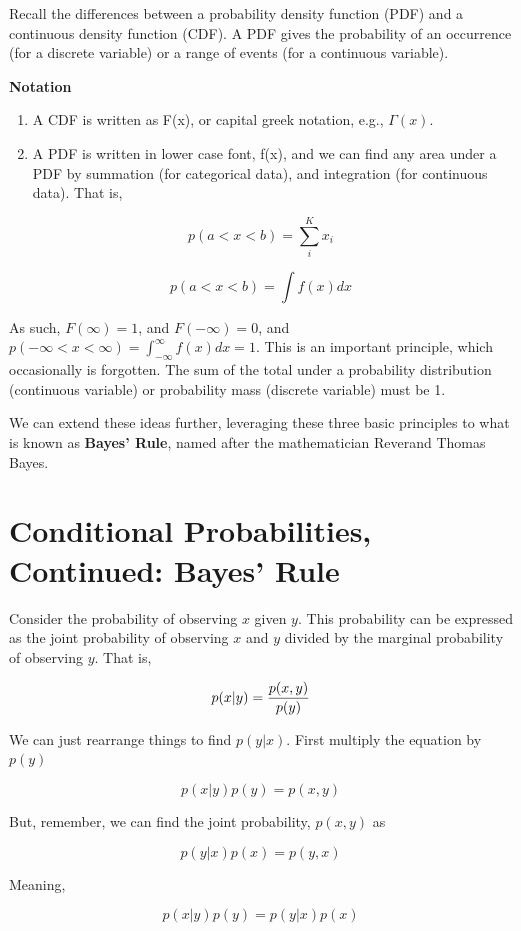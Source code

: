 \documentclass[
]{book}
\begin{document}
Recall the differences between a probability density function (PDF) and a continuous density function (CDF). A PDF gives the probability of an occurrence (for a discrete variable) or a range of events (for a continuous variable).

\textbf{Notation}

\begin{enumerate}
\def\labelenumi{(\arabic{enumi})}
\item
  A CDF is written as F(x), or capital greek notation, e.g., \(\Gamma(x)\).
\item
  A PDF is written in lower case font, f(x), and we can find any area under a PDF by summation (for categorical data), and integration (for continuous data). That is,
\end{enumerate}

\[p(a<x<b)=\sum_i^{K} x_i\]

\[p(a<x<b)=\int f(x) dx\]

As such, \(F(\infty)=1\), and \(F(-\infty)=0\), and \(p(-\infty < x < \infty)=\int_{-\infty}^{\infty}f(x)dx=1\). This is an important principle, which occasionally is forgotten. The sum of the total under a probability distribution (continuous variable) or probability mass (discrete variable) must be 1.

We can extend these ideas further, leveraging these three basic principles to what is known as \textbf{Bayes' Rule}, named after the mathematician Reverand Thomas Bayes.

\section{Conditional Probabilities, Continued: Bayes' Rule}\label{conditional-probabilities-continued-bayes-rule}

Consider the probability of observing \(x\) given \(y\). This probability can be expressed as the joint probability of observing \(x\) and \(y\) divided by the marginal probability of observing \(y\). That is,

\[p(x|y)={p(x,y)\over p(y)}\]

We can just rearrange things to find \(p(y|x)\). First multiply the equation by \(p(y)\)

\[p(x|y) p(y)=p(x,y) \]

But, remember, we can find the joint probability, \(p(x,y)\) as

\[p(y|x) p(x)=p(y,x) \]

Meaning,

\[p(x|y) p(y)=p(y|x) p(x)\]
\end{document}
